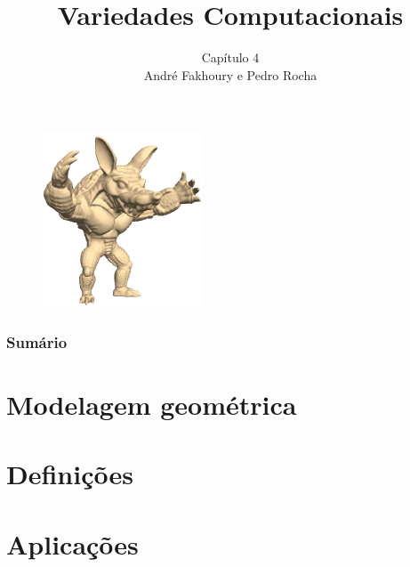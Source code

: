 \documentclass[serif,10pt]{beamer}
\title[]{{\bf \huge{Variedades Computacionais}}}
\author[Variedades Computacionais]{
         {\huge \color{blue} Capítulo 4} \\ \vspace{0.5cm}
         {\large André Fakhoury e Pedro Rocha} \vspace{0.5cm}}
\date{ }
\begin{document}
\begin{frame}
\maketitle
\vspace{-2.0cm}
\begin{figure}[] 
\begin{center} 
   \includegraphics[clip,scale=0.4]{imagens/Olga_Sorkine_3.png} 
\end{center}
\end{figure} 
\end{frame} 
 



\begin{frame}[allowframebreaks]
\frametitle{Sumário}
\tableofcontents
\end{frame}

\centering

\section{Modelagem geométrica}


\section{Definições}


\section{Aplicações}

\end{document}
